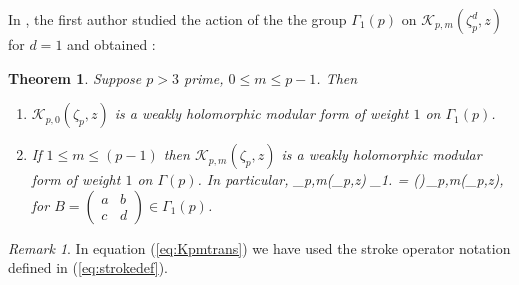 \documentclass[12pt]{amsart}
\newtheorem{theorem}{Theorem}[section]
\theoremstyle{definition}
\theoremstyle{remark}
\newtheorem*{remark}{Remark}
\numberwithin{equation}{section}
\newcommand\Lpar[1]{\left(#1\right)}
\newcommand\AMat{\begin{pmatrix} a & b \\ c & d \end{pmatrix}}
\newcommand\stroke[3]{#1\,\left\arrowvert\,\left[#2\right]_{#3}\right.}
\newcommand\eqn[1]{(\ref{eq:#1})}
\begin{document}
In \cite{Ga19a}, the first author studied the action of the the group $\Gamma_1(p)$ on  $\mathcal{K}_{p,m}(\zeta_p^d,z)$ for $d=1$ and obtained :

\begin{theorem}\cite[Theorem 6.3, p.234]{Ga19a}
\label{thm:KpmthmG}
Suppose $p>3$ prime, $0 \le m \le p-1$.             
Then\\
\begin{enumerate}
\item[(i)]
$\mathcal{K}_{p,0}(\zeta_p,z)$ is a weakly holomorphic modular form of weight 
$1$ on
$\Gamma_1(p)$.
\item[(ii)]
If $1 \le m \le (p-1)$ then $\mathcal{K}_{p,m}(\zeta_p,z)$ is a 
weakly holomorphic modular form of weight $1$ on
$\Gamma(p)$.                           
In particular,
\beq
\stroke{_{p,m}(\zeta_p,z)}{B}{1}
= \exp\Lpar{}\,_{p,m}(\zeta_p,z),
\label{eq:Kpmtrans}
\eeq
for $B=\AMat\in\Gamma_1(p)$.  
\end{enumerate}
\end{theorem}
\begin{remark}
In equation \eqn{Kpmtrans} we have used the stroke operator notation
defined in \eqn{strokedef}.
\end{remark}
\end{document}
